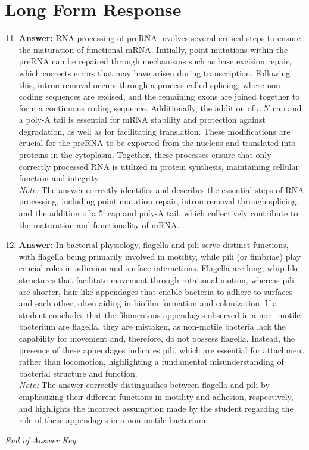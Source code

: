 \documentclass[12pt]{article}
\begin{document}
\section*{Long Form Response}
\begin{enumerate}[label=\arabic*.]
\setcounter{enumi}{10}
\item \textbf{Answer:} RNA processing of preRNA involves several critical steps to ensure the maturation of functional mRNA. Initially, point mutations within the preRNA can be repaired through mechanisms such as base excision repair, which corrects errors that may have arisen during transcription. Following this, intron removal occurs through a process called splicing, where non-coding sequences are excised, and the remaining exons are joined together to form a continuous coding sequence. Additionally, the addition of a 5′ cap and a poly-A tail is essential for mRNA stability and protection against degradation, as well as for facilitating translation. These modifications are crucial for the preRNA to be exported from the nucleus and translated into proteins in the cytoplasm. Together, these processes ensure that only correctly processed RNA is utilized in protein synthesis, maintaining cellular function and integrity.
\\ \textit{Note:} The answer correctly identifies and describes the essential steps of RNA processing, including point mutation repair, intron removal through splicing, and the addition of a 5′ cap and poly-A tail, which collectively contribute to the maturation and functionality of mRNA.
\item \textbf{Answer:} In bacterial physiology, flagella and pili serve distinct functions, with flagella being primarily involved in motility, while pili (or fimbriae) play crucial roles in adhesion and surface interactions. Flagella are long, whip-like structures that facilitate movement through rotational motion, whereas pili are shorter, hair-like appendages that enable bacteria to adhere to surfaces and each other, often aiding in biofilm formation and colonization. If a student concludes that the filamentous appendages observed in a non- motile bacterium are flagella, they are mistaken, as non-motile bacteria lack the capability for movement and, therefore, do not possess flagella. Instead, the presence of these appendages indicates pili, which are essential for attachment rather than locomotion, highlighting a fundamental misunderstanding of bacterial structure and function.
\\ \textit{Note:} The answer correctly distinguishes between flagella and pili by emphasizing their different functions in motility and adhesion, respectively, and highlights the incorrect assumption made by the student regarding the role of these appendages in a non-motile bacterium.
\end{enumerate}

\vfill
\noindent\textit{End of Answer Key}
\end{document}

